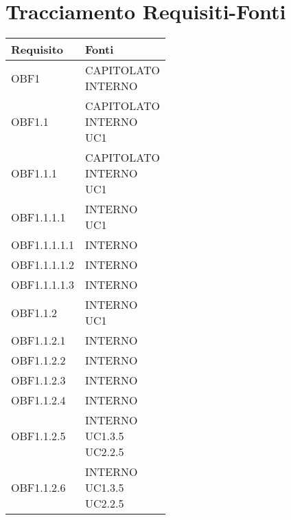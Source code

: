 \documentclass{scalatekids-article}
\begin{document}
\section{Tracciamento Requisiti-Fonti}
\begin{longtable}[H]{|p{5.5cm}|p{5.5cm}|}
\hline
\textbf{Requisito} & \textbf{Fonti}\\
\hline
OBF1 & \multiLineCell[t]{CAPITOLATO\\INTERNO\\}\\
\hline
OBF1.1 & \multiLineCell[t]{CAPITOLATO\\INTERNO\\UC1\\}\\
\hline
OBF1.1.1 & \multiLineCell[t]{CAPITOLATO\\INTERNO\\UC1\\}\\
\hline
OBF1.1.1.1 & \multiLineCell[t]{INTERNO\\UC1\\}\\
\hline
OBF1.1.1.1.1 & \multiLineCell[t]{INTERNO\\}\\
\hline
OBF1.1.1.1.2 & \multiLineCell[t]{INTERNO\\}\\
\hline
OBF1.1.1.1.3 & \multiLineCell[t]{INTERNO\\}\\
\hline
OBF1.1.2 & \multiLineCell[t]{INTERNO\\UC1\\}\\
\hline
OBF1.1.2.1 & \multiLineCell[t]{INTERNO\\}\\
\hline
OBF1.1.2.2 & \multiLineCell[t]{INTERNO\\}\\
\hline
OBF1.1.2.3 & \multiLineCell[t]{INTERNO\\}\\
\hline
OBF1.1.2.4 & \multiLineCell[t]{INTERNO\\}\\
\hline
OBF1.1.2.5 & \multiLineCell[t]{INTERNO\\UC1.3.5\\UC2.2.5\\}\\
\hline
OBF1.1.2.6 & \multiLineCell[t]{INTERNO\\UC1.3.5\\UC2.2.5\\}\\

\end{longtable}
\end{document}
